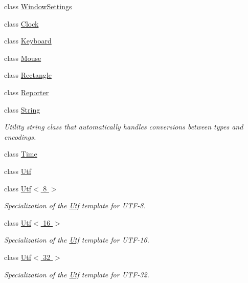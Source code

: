 \begin{DoxyCompactItemize}
class \hyperlink{classburn_1_1_window_settings}{Window\-Settings}
\item 
class \hyperlink{classburn_1_1_clock}{Clock}
\item 
class \hyperlink{classburn_1_1_keyboard}{Keyboard}
\item 
class \hyperlink{classburn_1_1_mouse}{Mouse}
\item 
class \hyperlink{classburn_1_1_rectangle}{Rectangle}
\item 
class \hyperlink{classburn_1_1_reporter}{Reporter}
\item 
class \hyperlink{classburn_1_1_string}{String}
\begin{DoxyCompactList}\small\item\em Utility string class that automatically handles conversions between types and encodings. \end{DoxyCompactList}\item 
class \hyperlink{classburn_1_1_time}{Time}
\item 
class \hyperlink{classburn_1_1_utf}{Utf}
\item 
class \hyperlink{classburn_1_1_utf_3_018_01_4}{Utf$<$ 8 $>$}
\begin{DoxyCompactList}\small\item\em Specialization of the \hyperlink{classburn_1_1_utf}{Utf} template for U\-T\-F-\/8. \end{DoxyCompactList}\item 
class \hyperlink{classburn_1_1_utf_3_0116_01_4}{Utf$<$ 16 $>$}
\begin{DoxyCompactList}\small\item\em Specialization of the \hyperlink{classburn_1_1_utf}{Utf} template for U\-T\-F-\/16. \end{DoxyCompactList}\item 
class \hyperlink{classburn_1_1_utf_3_0132_01_4}{Utf$<$ 32 $>$}
\begin{DoxyCompactList}\small\item\em Specialization of the \hyperlink{classburn_1_1_utf}{Utf} template for U\-T\-F-\/32. \end{DoxyCompactList}\end{DoxyCompactItemize}
